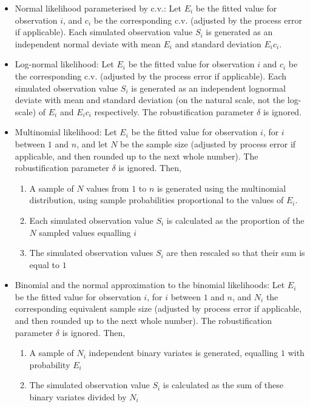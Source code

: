 \begin{itemize}
  \item{} Normal likelihood parameterised by c.v.: Let $E_{i}$ be the fitted value for observation $i$, and $c_i$ be the corresponding c.v. (adjusted by the process error if applicable). Each simulated observation value $S_i$ is generated as an independent normal deviate with mean $E_i$ and standard deviation $E_i c_i$.
  \item{} Log-normal likelihood: Let $E_i$ be the fitted value for observation $i$ and $c_i$ be the corresponding c.v. (adjusted by the process error if applicable). Each simulated observation value $S_i$ is generated as an independent lognormal deviate with mean and standard deviation (on the natural scale, not the log-scale) of $E_i$ and $E_i c_i$ respectively. The robustification parameter $\delta$ is ignored.
  \item{} Multinomial likelihood: Let $E_i$ be the fitted value for observation $i$, for $i$ between $1$ and $n$, and let $N$ be the sample size (adjusted by process error if applicable, and then rounded up to the next whole number). The robustification parameter $\delta$ is ignored. Then,
  \begin{enumerate}
    \item{} A sample of $N$ values from $1$ to $n$ is generated using the multinomial distribution, using sample probabilities proportional to the values of $E_i$.
    \item{} Each simulated observation value $S_i$ is calculated as the proportion of the $N$ sampled values equalling $i$
    \item{} The simulated observation values $S_i$ are then rescaled so that their sum is equal to $1$
  \end{enumerate}
  \item{} Binomial and the normal approximation to the binomial likelihoods: Let $E_i$ be the fitted value for observation $i$, for $i$ between $1$ and $n$, and $N_i$ the corresponding equivalent sample size (adjusted by process error if applicable, and then rounded up to the next whole number). The robustification parameter $\delta$ is ignored. Then,
  \begin{enumerate}
    \item{} A sample of $N_i$ independent binary variates is generated, equalling $1$ with probability $E_i$
    \item{}	The simulated observation value $S_i$ is calculated as the sum of these binary variates divided by $N_i$
  \end{enumerate}
\end{itemize}

